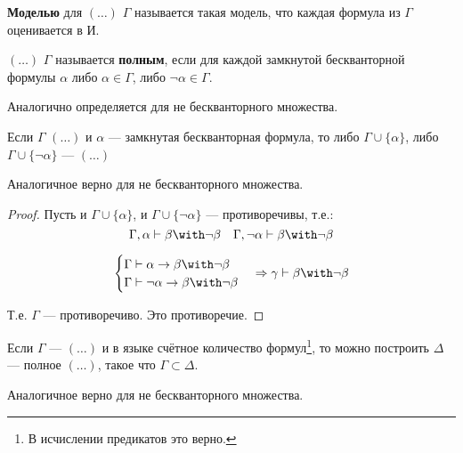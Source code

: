 \begin{definition}
    \textbf{Моделью} для \((\ldots)\) \(\Gamma\) называется такая модель, что каждая формула из \(\Gamma\) оценивается в \(\text{И}\).
\end{definition}

\begin{definition}
    \((\ldots)\) \(\Gamma\) называется \textbf{полным}, если для каждой замкнутой бескванторной формулы \(\alpha\) либо \(\alpha \in \Gamma\), либо \(\neg \alpha \in \Gamma\).

    Аналогично определяется для не бескванторного множества.
\end{definition}

\begin{theorem}
    Если \(\Gamma\) \((\ldots)\) и \(\alpha\) --- замкнутая бескванторная формула, то либо \(\Gamma \cup \{\alpha\} \), либо \(\Gamma \cup \{\neg \alpha\}\) --- \((\ldots)\)

    Аналогичное верно для не бескванторного множества.
\end{theorem}
\begin{proof}
    Пусть и \(\Gamma \cup \{\alpha\} \), и \(\Gamma \cup \{\neg \alpha\} \) --- противоречивы, т.е.:
    \[\Gamma, \alpha \vdash \beta \with \neg \beta \quad \Gamma, \neg \alpha \vdash \beta \with \neg \beta\]

    \[\begin{cases} \Gamma \vdash \alpha \to \beta \with \neg \beta \\ \Gamma \vdash \neg \alpha \to \beta \with \neg \beta \end{cases} \Rightarrow \gamma \vdash \beta \with \neg \beta \]

    Т.е. \(\Gamma\) --- противоречиво. Это противоречие.
\end{proof}

\begin{theorem}
    Если \(\Gamma\) --- \((\ldots)\) и в языке счётное количество формул\footnote{В исчислении предикатов это верно.}, то можно построить \(\Delta\) --- полное \((\ldots)\), такое что \(\Gamma \subset \Delta\).

    Аналогичное верно для не бескванторного множества.
\end{theorem}

